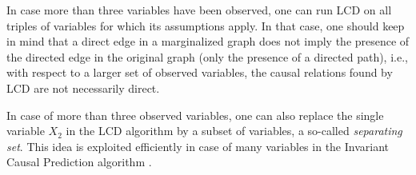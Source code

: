 In case more than three variables have been observed, one can run LCD on all triples of variables for which its assumptions apply.
In that case, one should keep in mind that a direct edge in a marginalized graph does not imply the presence of the directed 
edge in the original graph (only the presence of a directed path), i.e., with respect to a larger set of observed variables, 
the causal relations found by LCD are not necessarily direct.

In case of more than three observed variables, one can also replace the single variable $X_2$ in the LCD algorithm by a subset
of variables, a so-called \emph{separating set}. This idea is exploited efficiently in case of many variables in the Invariant Causal Prediction algorithm \cite{ICP2016}.

